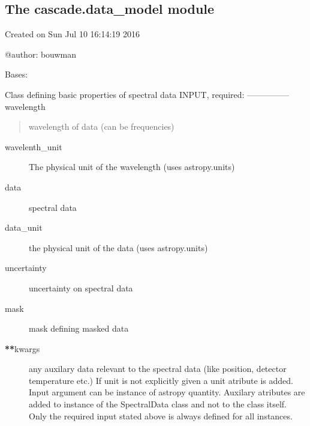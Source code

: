 \documentclass[a4paper,11pt,english]{sphinxmanual}
\begin{document}
\subsection{The cascade.data\_model module}
\label{\detokenize{cascade.data_model:module-cascade.data_model.data_model}}\label{\detokenize{cascade.data_model:the-cascade-data-model-module}}\label{\detokenize{cascade.data_model::doc}}
Created on Sun Jul 10 16:14:19 2016

@author: bouwman

\begin{fulllineitems}
\label{\detokenize{cascade.data_model:cascade.data_model.data_model.SpectralData}}
Bases: 

Class defining basic properties of spectral data
INPUT, required:
—————\textendash{}
wavelength
\begin{quote}

wavelength of data (can be frequencies)
\end{quote}
\begin{description}
\item[{wavelenth\_unit}] \leavevmode
The physical unit of the wavelength (uses astropy.units)

\item[{data}] \leavevmode
spectral data

\item[{data\_unit}] \leavevmode
the physical unit of the data (uses astropy.units)

\item[{uncertainty}] \leavevmode
uncertainty on spectral data

\item[{mask}] \leavevmode
mask defining masked data

\end{description}
\begin{description}
\item[{{\color{red}\bfseries{}**}kwargs}] \leavevmode
any auxilary data relevant to the spectral data
(like position, detector temperature etc.)
If unit is not explicitly given a unit atribute is added.
Input argument can be instance of astropy quantity.
Auxilary atributes are added to instance of the SpectralData class
and not to the class itself. Only the required input stated above
is always defined for all instances.


\end{description}
\end{fulllineitems}
\end{document}
